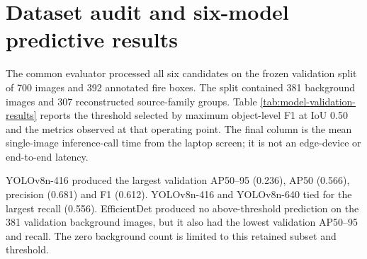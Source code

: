 \section{Dataset audit and six-model predictive results}
\label{sec:results:1}

The common evaluator processed all six candidates on the frozen validation
split of 700 images and 392 annotated fire boxes. The split contained 381
background images and 307 reconstructed source-family groups. Table
\ref{tab:model-validation-results} reports the threshold selected by maximum
object-level F1 at IoU 0.50 and the metrics observed at that operating point.
The final column is the mean single-image inference-call time from the laptop
screen; it is not an edge-device or end-to-end latency.

\begin{table}[p]
  \centering
  \caption{Common validation results on 700 images and 392 fire boxes. B-FPI
  is the proportion of 381 background images containing at least one retained
  prediction. Each timing row contains 700 post-warm-up inference calls.}
  \label{tab:model-validation-results}
  \small
\end{table}

YOLOv8n-416 produced the largest validation AP50--95 (0.236), AP50
(0.566), precision (0.681) and F1 (0.612). YOLOv8n-416 and YOLOv8n-640 tied
for the largest recall (0.556). EfficientDet produced no above-threshold
prediction on the 381 validation background images, but it also had the lowest
validation AP50--95 and recall. The zero background count is limited to this
retained subset and threshold.

